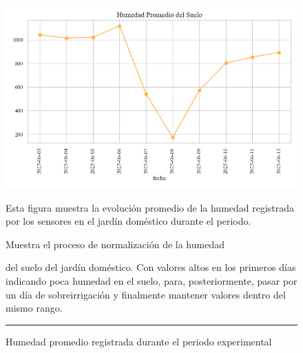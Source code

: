\documentclass[pdflatex,sn-mathphys-num]{sn-jnl}%
\theoremstyle{thmstyleone}%
\theoremstyle{thmstyletwo}%
\theoremstyle{thmstylethree}%
\begin{document}
\newpage
\begin{figure}[H]
    \centering
    \includegraphics[width=1\textwidth]{assets/humedad_promedio.png}

    \caption{Humedad promedio registrada durante el periodo experimental}
    \label{fig:humedad_del_suelo}

    \vspace{0.4cm}

    \noindent
    \begin{minipage}[t]{0.49\textwidth}
        \justifying
        Esta figura muestra la evolución promedio de la humedad registrada por los sensores en el jardín doméstico durante el periodo.

        Muestra el proceso de normalización de la humedad
    \end{minipage}%
    \hfill
    \begin{minipage}[t]{0.49\textwidth}
        \justifying
        \noindent del suelo del jardín doméstico. Con valores altos en los primeros días indicando poca humedad en el suelo, para, posteriormente, pasar por un día de sobreirrigación y finalmente mantener valores dentro del mismo rango.
    \end{minipage}

    \vspace{0.5cm}
    \hrule
\end{figure}
\end{document}
